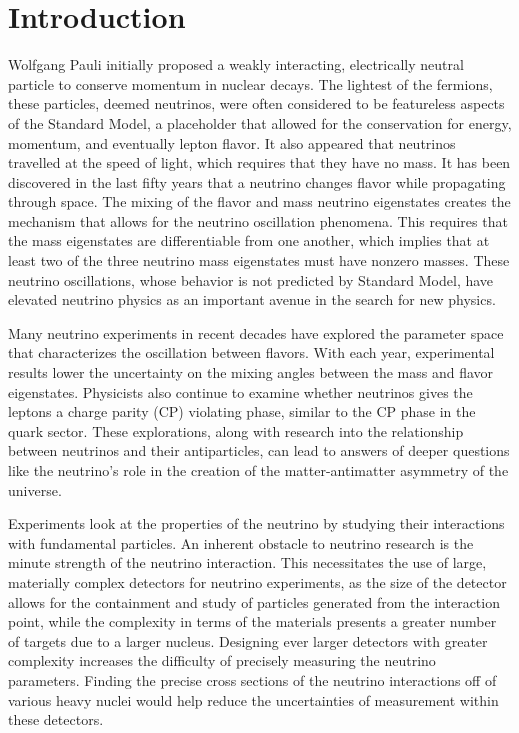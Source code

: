 \documentclass[../main.tex]{subfiles}
\begin{document}
\chapter{Introduction}
Wolfgang Pauli initially proposed a weakly interacting, electrically neutral particle to conserve momentum in nuclear decays. The lightest of the fermions, these particles, deemed neutrinos, were often considered to be featureless aspects of the Standard Model, a placeholder that allowed for the conservation for energy, momentum, and eventually lepton flavor.  It also appeared that neutrinos travelled at the speed of light, which requires that they have no mass.  It has been discovered in the last fifty years that a neutrino changes flavor while propagating through space.  The mixing of the flavor and mass neutrino eigenstates creates the mechanism that allows for the neutrino oscillation phenomena.  This requires that the mass eigenstates are differentiable from one another, which implies that at least two of the three neutrino mass eigenstates must have nonzero masses. These neutrino oscillations, whose behavior is not predicted by Standard Model, have elevated neutrino physics as an important avenue in the search for new physics.

Many neutrino experiments in recent decades have explored the parameter space that characterizes the oscillation between flavors.  With each year, experimental results lower the uncertainty on the mixing angles between the mass and flavor eigenstates.  Physicists also continue to examine whether neutrinos gives the leptons a charge parity (CP) violating phase, similar to the CP phase in the quark sector.  These explorations, along with research into the relationship between neutrinos and their antiparticles, can lead to answers of deeper questions like the neutrino’s role in the creation of the matter-antimatter asymmetry of the universe.

Experiments look at the properties of the neutrino by studying their interactions with fundamental particles. An inherent obstacle to neutrino research is the minute strength of the neutrino interaction.  This necessitates the use of large, materially complex detectors for neutrino experiments, as the size of the detector allows for the containment and study of particles generated from the interaction point, while the complexity in terms of the materials presents a greater number of targets due to a larger nucleus.  Designing ever larger detectors with greater complexity increases the difficulty of precisely measuring the neutrino parameters.  Finding the precise cross sections of the neutrino interactions off of various heavy nuclei would help reduce the uncertainties of measurement within these detectors.
\end{document}
